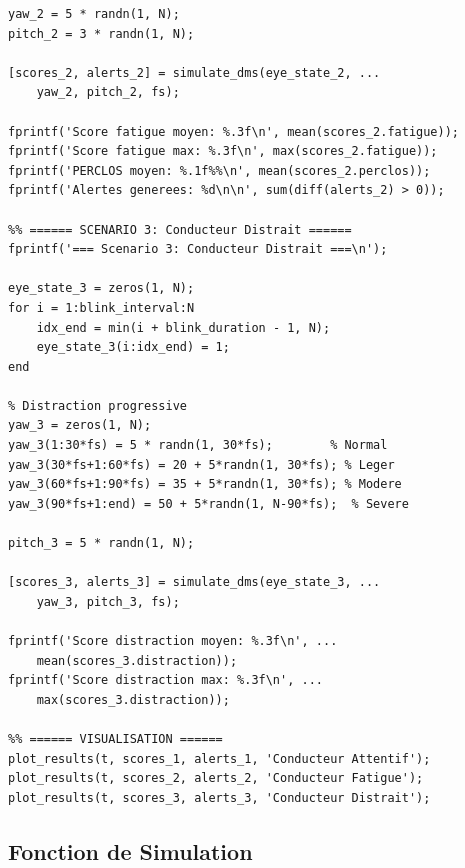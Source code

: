 \begin{lstlisting}[style=matlabstyle, caption={Script principal de simulation DMS en MATLAB.}, label={lst:simulation_matlab}]
yaw_2 = 5 * randn(1, N);
pitch_2 = 3 * randn(1, N);

[scores_2, alerts_2] = simulate_dms(eye_state_2, ...
    yaw_2, pitch_2, fs);

fprintf('Score fatigue moyen: %.3f\n', mean(scores_2.fatigue));
fprintf('Score fatigue max: %.3f\n', max(scores_2.fatigue));
fprintf('PERCLOS moyen: %.1f%%\n', mean(scores_2.perclos));
fprintf('Alertes generees: %d\n\n', sum(diff(alerts_2) > 0));

%% ====== SCENARIO 3: Conducteur Distrait ======
fprintf('=== Scenario 3: Conducteur Distrait ===\n');

eye_state_3 = zeros(1, N);
for i = 1:blink_interval:N
    idx_end = min(i + blink_duration - 1, N);
    eye_state_3(i:idx_end) = 1;
end

% Distraction progressive
yaw_3 = zeros(1, N);
yaw_3(1:30*fs) = 5 * randn(1, 30*fs);        % Normal
yaw_3(30*fs+1:60*fs) = 20 + 5*randn(1, 30*fs); % Leger
yaw_3(60*fs+1:90*fs) = 35 + 5*randn(1, 30*fs); % Modere
yaw_3(90*fs+1:end) = 50 + 5*randn(1, N-90*fs);  % Severe

pitch_3 = 5 * randn(1, N);

[scores_3, alerts_3] = simulate_dms(eye_state_3, ...
    yaw_3, pitch_3, fs);

fprintf('Score distraction moyen: %.3f\n', ...
    mean(scores_3.distraction));
fprintf('Score distraction max: %.3f\n', ...
    max(scores_3.distraction));

%% ====== VISUALISATION ======
plot_results(t, scores_1, alerts_1, 'Conducteur Attentif');
plot_results(t, scores_2, alerts_2, 'Conducteur Fatigue');
plot_results(t, scores_3, alerts_3, 'Conducteur Distrait');
\end{lstlisting}

\subsection{Fonction de Simulation}

